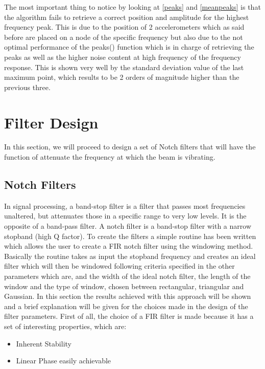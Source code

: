\documentclass[12pt,a4paper,twoside]{article}
\begin{document}
The most important thing to notice by looking at \figurename{ \ref{peaks}} and \figurename{ \ref{meanpeaks}} is that the algorithm fails to retrieve a correct position and amplitude for the highest frequency peak. This is due to the position of 2 accelerometers which as said before are placed on a node of the specific frequency but also due to the not optimal performance of the peaks() function which is in charge of retrieving the peaks as well as the higher noise content at high frequency of the frequency response. This is shown very well by the standard deviation value of the last maximum point, which results to be 2 orders of magnitude higher than the previous three.

\section{Filter Design}

In this section, we will proceed to design a set of Notch filters that will have the function of attenuate the frequency at which the beam is vibrating.

\subsection{Notch Filters}

In signal processing, a band-stop filter is a filter that passes most frequencies unaltered, but attenuates those in a specific range to very low levels. It is the opposite of a band-pass filter. A notch filter is a band-stop filter with a narrow stopband (high Q factor).
To create the filters a simple routine has been written which allows the user to create a FIR notch filter using the windowing method.
Basically the routine takes as input the stopband frequency and creates an ideal filter which will then be windowed following criteria specified in the other parameters which are, and the width of the ideal notch filter, the length of the window and the type of window, chosen between rectangular, triangular and Gaussian.
In this section the results achieved with this approach will be shown and a brief explanation will be given for the choices made in the design of the filter parameters.
First of all, the choice of a FIR filter is made because it has a set of interesting properties, which are:
\begin{itemize}
    \item Inherent Stability
    \item Linear Phase easily achievable
\end{itemize}
\end{document}
